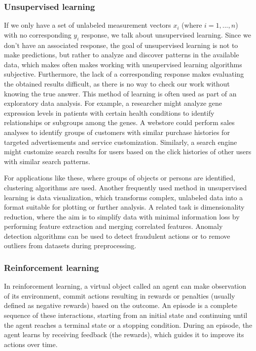 \documentclass[a4paper,oneside,onecolumn,12pt]{book}
\begin{document}
		\subsubsection{Unsupervised learning}
		If we only have a set of unlabeled measurement vectors $x_i$ (where $i = 1, ..., n$) with no corresponding $y_i$ response, we talk about unsupervised learning. Since we don't have an associated response, the goal of unsupervised learning is not to make predictions, but rather to analyze and discover patterns in the available data, which makes often makes working with unsupervised learning algorithms subjective. Furthermore, the lack of a corresponding response makes evaluating the obtained results difficult, as there is no way to check our work without knowing the true answer. This method of learning is often used as part of an exploratory data analysis. For example, a researcher might analyze gene expression levels in patients with certain health conditions to identify relationships or subgroups among the genes. A webstore could perform sales analyses to identify groups of customers with similar purchase histories for targeted advertisements and service customization. Similarly, a search engine might customize search results for users based on the click histories of other users with similar search patterns. \cite{AISL} 

		For applications like these, where groups of objects or persons are identified, clustering algorithms are used. Another frequently used method in unsupervised learning is data visualization, which transforms complex, unlabeled data into a format suitable for plotting or further analysis. A related task is dimensionality reduction, where the aim is to simplify data with minimal information loss by performing feature extraction and merging correlated features. Anomaly detection algorithms can be used to detect fraudulent actions or to remove outliers from datasets during preprocessing. \cite{HMLSKT}

		\subsubsection{Reinforcement learning}
		In reinforcement learning, a virtual object called an agent can make observation of its environment, commit actions resulting in rewards or penalties (usually defined as negative rewards) based on the outcome. An episode is a complete sequence of these interactions, starting from an initial state and continuing until the agent reaches a terminal state or a stopping condition. During an episode, the agent learns by receiving feedback (the rewards), which guides it to improve its actions over time. \cite{HMLSKT}
\end{document}
